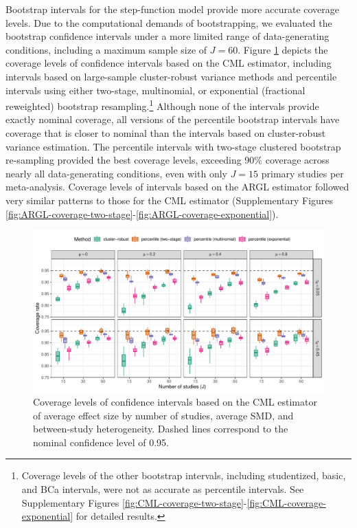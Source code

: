 \documentclass[
  american,
  man, donotrepeattitle,floatsintext]{apa7}
\begin{document}
Bootstrap intervals for the step-function model provide more accurate coverage levels.
Due to the computational demands of bootstrapping, we evaluated the bootstrap confidence intervals under a more limited range of data-generating conditions, including a maximum sample size of \(J = 60\).
Figure \ref{fig:CML-coverage} depicts the coverage levels of confidence intervals based on the CML estimator, including intervals based on large-sample cluster-robust variance methods and percentile intervals using either two-stage, multinomial, or exponential (fractional reweighted) bootstrap resampling.\footnote{Coverage levels of the other bootstrap intervals, including studentized, basic, and BCa intervals, were not as accurate as percentile intervals. See Supplementary Figures \ref{fig:CML-coverage-two-stage}-\ref{fig:CML-coverage-exponential} for detailed results.}
Although none of the intervals provide exactly nominal coverage, all versions of the percentile bootstrap intervals have coverage that is closer to nominal than the intervals based on cluster-robust variance estimation.
The percentile intervals with two-stage clustered bootstrap re-sampling provided the best coverage levels, exceeding 90\% coverage across nearly all data-generating conditions, even with only \(J = 15\) primary studies per meta-analysis.
Coverage levels of intervals based on the ARGL estimator followed very similar patterns to those for the CML estimator (Supplementary Figures \ref{fig:ARGL-coverage-two-stage}-\ref{fig:ARGL-coverage-exponential}).

\begin{figure}
\includegraphics{step-function-selection-models-with-dependent-effects_files/figure-latex/CML-coverage-1} \caption{Coverage levels of confidence intervals based on the CML estimator of average effect size by number of studies, average SMD, and between-study heterogeneity. Dashed lines correspond to the nominal confidence level of 0.95.}\label{fig:CML-coverage}
\end{figure}
\end{document}
